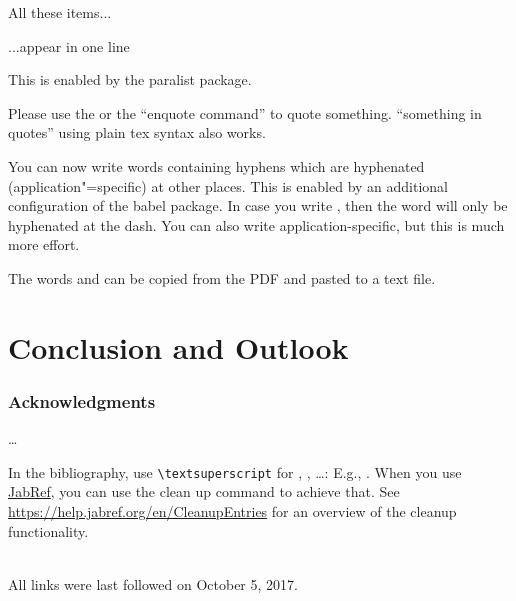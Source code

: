 \documentclass[runningheads,a4paper]{llncs}[2017/09/04]
\begin{document}
\begin{inparaenum}
  \item All these items...
  \item ...appear in one line
  \item This is enabled by the paralist package.
\end{inparaenum}

Please use the  or the \enquote{enquote command} to quote something.
``something in quotes'' using plain tex syntax also works.

You can now write words containing hyphens which are hyphenated (application"=specific) at other places.
This is enabled by an additional configuration of the babel package.
In case you write , then the word will only be hyphenated at the dash.
You can also write applica\allowbreak{}tion-specific, but this is much more effort.

The words  and  can be copied from the PDF and pasted to a text file.


\section{Conclusion and Outlook}
\label{sec:outlook}
\lipsum[1-2]

\subsubsection*{Acknowledgments}
\ldots

In the bibliography, use \texttt{\textbackslash textsuperscript} for , , \ldots:
E.g., .
When you use \href{https://www.jabref.org}{JabRef}, you can use the clean up command to achieve that.
See \url{https://help.jabref.org/en/CleanupEntries} for an overview of the cleanup functionality.

\renewcommand{\bibsection}{\section*{References}} %

\begingroup
  \ifluatex
  \else
  \fi
  
\endgroup

\ \\
%
All links were last followed on October 5, 2017.
\end{document}
